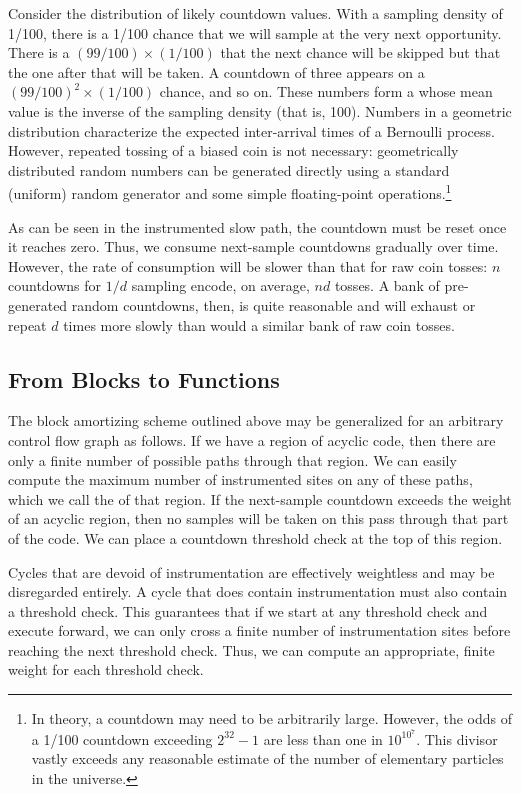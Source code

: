 Consider the distribution of likely countdown values.  With a sampling
density of 1/100, there is a 1/100 chance that we will sample at the
very next opportunity.  There is a $(99/100) \times (1/100)$ that the
next chance will be skipped but that the one after that will be taken.
A countdown of three appears on a $(99/100)^2 \times (1/100)$ chance,
and so on.  These numbers form a 
whose mean value is the inverse of the sampling density (that is,
100).  Numbers in a geometric distribution characterize the expected
inter-arrival times of a Bernoulli process.  However, repeated tossing
of a biased coin is not necessary: geometrically distributed random
numbers can be generated directly using a standard (uniform) random
generator and some simple floating-point operations.\footnote{In
  theory, a countdown may need to be arbitrarily large.  However, the
  odds of a 1/100 countdown exceeding $2^{32}-1$ are less than one in
  $10^{10^7}$.  This divisor vastly exceeds any reasonable estimate of
  the number of elementary particles in the universe.}

As can be seen in the instrumented slow path, the countdown must be
reset once it reaches zero.  Thus, we consume next-sample countdowns
gradually over time.  However, the rate of consumption will be slower
than that for raw coin tosses: $n$ countdowns for $1/d$ sampling
encode, on average, $nd$ tosses.  A bank of pre-generated random
countdowns, then, is quite reasonable and will exhaust or repeat $d$
times more slowly than would a similar bank of raw coin tosses.

\subsection{From Blocks to Functions}

The block amortizing scheme outlined above may be generalized for an
arbitrary control flow graph as follows.  If we have a region of
acyclic code, then there are only a finite number of possible paths
through that region.  We can easily compute the maximum number of
instrumented sites on any of these paths, which we call the
 of that region.  If the next-sample countdown exceeds
the weight of an acyclic region, then no samples will be taken on this
pass through that part of the code.  We can place a countdown
threshold check at the top of this region.

Cycles that are devoid of instrumentation are effectively weightless
and may be disregarded entirely.  A cycle that does contain
instrumentation must also contain a threshold check.  This guarantees
that if we start at any threshold check and execute forward, we can
only cross a finite number of instrumentation sites before reaching
the next threshold check.  Thus, we can compute an appropriate, finite
weight for each threshold check.

